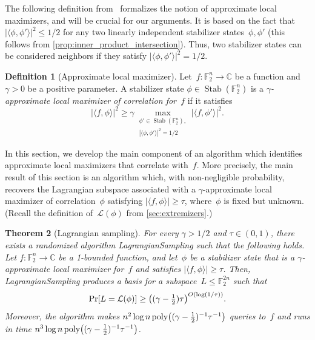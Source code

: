 \documentclass[11pt]{amsart}
\renewcommand{\Pr}{\mathop{\mbox{\rm Pr}}}
\DeclareMathOperator{\Stab}{Stab}\DeclareMathOperator{\Spec}{Spec}
\newcommand{\C}{\mathbb{C}} %
\newcommand{\F}{\mathbb{F}} %
\newcommand{\Lcal}{\mathcal{L}}
\newcommand{\poly}{\mbox{\rm poly}}
\theoremstyle{plain}
\newtheorem{theorem}{Theorem}[section]
\theoremstyle{definition}
\newtheorem{definition}[theorem]{Definition}
\theoremstyle{remark}
\begin{document}
The following definition from~\cite{chen2024stabilizer} formalizes the notion of approximate local maximizers, and will be crucial for our arguments.
It is based on the fact that $|\langle\phi,\phi'\rangle|^2 \leq 1/{2}$ for any two linearly independent stabilizer states~$\phi, \phi'$ (this follows from \cref{prop:inner_product_intersection}).
Thus, two stabilizer states can be considered neighbors if they satisfy $|\langle\phi,\phi'\rangle|^2 = 1/2$.

\begin{definition}[Approximate local maximizer]
    Let~$f:\F_2^n \to \C$ be a function and $\gamma>0$ be a positive parameter.
    A stabilizer state $\phi\in \Stab(\F_2^n)$ is a \emph{$\gamma$-approximate local maximizer of correlation for~$f$} if it satisfies
    \begin{equation*}
        |\langle f, \phi\rangle|^2
        \geq
        \gamma \max_{\substack{\phi'\in \Stab(\F_2^n),\\ |\langle\phi,\phi'\rangle|^2 = 1/2}} |\langle f, \phi'\rangle|^2.
    \end{equation*}
\end{definition}

In this section, we develop the main component of an algorithm which identifies approximate local maximizers that correlate with~$f$.
More precisely, the main result of this section is an algorithm which, with non-negligible probability, recovers the Lagrangian subspace associated with a $\gamma$-approximate local maximizer of correlation~$\phi$ satisfying $|\langle f, \phi\rangle| \geq \tau$, where~$\phi$ is fixed but unknown.
(Recall the definition of~$\Lcal(\phi)$ from \cref{sec:extremizers}.)

\begin{theorem}[Lagrangian sampling] \label{thm:lagrangian}
For every $\gamma>1/2$ and $\tau\in (0,1)$, there exists a randomized algorithm {\sc LagrangianSampling} such that the following holds. 
Let $f:\F_2^n\to\C$ be a 1-bounded function, and let~$\phi$ be a stabilizer state that is a $\gamma$-approximate local maximizer for~$f$ and satisfies $|\langle f, \phi\rangle|\geq \tau$.
Then, {\sc LagrangianSampling} produces a basis for a subspace~$L\leq \F_2^{2n}$ such that
$$\Pr[L = \Lcal(\phi)] \geq \big((\gamma - \tfrac{1}{2}) \tau\big)^{O(\log(1/\tau))}.$$
Moreover, the algorithm makes $n^2 \log n\, \poly\big((\gamma - \tfrac{1}{2})^{-1} \tau^{-1}\big)$ queries to~$f$ and runs in time $n^3 \log n\, \poly\big((\gamma - \tfrac{1}{2})^{-1} \tau^{-1}\big)$.
\end{theorem}
\end{document}
